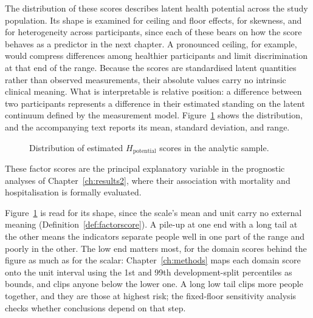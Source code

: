 The distribution of these scores describes latent health potential across the study population. Its shape is examined for ceiling and floor effects, for skewness, and for heterogeneity across participants, since each of these bears on how the score behaves as a predictor in the next chapter. A pronounced ceiling, for example, would compress differences among healthier participants and limit discrimination at that end of the range. Because the scores are standardised latent quantities rather than observed measurements, their absolute values carry no intrinsic clinical meaning. What is interpretable is relative position: a difference between two participants represents a difference in their estimated standing on the latent continuum defined by the measurement model. Figure~\ref{fig:score_dist} shows the distribution, and the accompanying text reports its mean, standard deviation, and range.

\begin{figure}[h]
\centering
{}
\captionsetup{justification=justified, width=\linewidth}
\caption{Distribution of estimated $H_{\text{potential}}$ scores in the analytic sample.}
\label{fig:score_dist}
\end{figure}

\medskip
{}

These factor scores are the principal explanatory variable in the prognostic analyses of Chapter~\ref{ch:results2}, where their association with mortality and hospitalisation is formally evaluated.

Figure~\ref{fig:score_dist} is read for its shape, since the scale's mean and unit carry no external meaning (Definition~\ref{def:factorscore}). A pile-up at one end with a long tail at the other means the indicators separate people well in one part of the range and poorly in the other. The low end matters most, for the domain scores behind the figure as much as for the scalar: Chapter~\ref{ch:methods} maps each domain score onto the unit interval using the 1st and 99th development-split percentiles as bounds, and clips anyone below the lower one. A long low tail clips more people together, and they are those at highest risk; the fixed-floor sensitivity analysis checks whether conclusions depend on that step.

